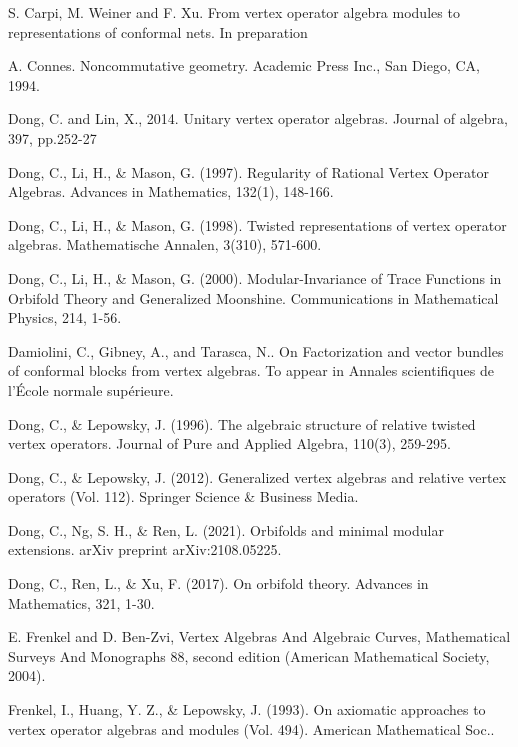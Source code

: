 \documentclass[11pt,b5paper,notitlepage]{article}
\theoremstyle{definition}
\theoremstyle{plain}
\numberwithin{equation}{section}
\begin{document}
\begin{thebibliography}{999999}
S. Carpi, M. Weiner and F. Xu. From vertex operator algebra modules to representations of conformal nets. In preparation


A. Connes. Noncommutative geometry. Academic Press Inc., San Diego, CA, 1994.



Dong, C. and Lin, X., 2014. Unitary vertex operator algebras. Journal of algebra, 397, pp.252-27



Dong, C., Li, H., \& Mason, G. (1997). Regularity of Rational Vertex Operator Algebras. Advances in Mathematics, 132(1), 148-166.

Dong, C., Li, H., \& Mason, G. (1998). Twisted representations of vertex operator algebras. Mathematische Annalen, 3(310), 571-600.

Dong, C., Li, H., \& Mason, G. (2000). Modular-Invariance of Trace Functions in Orbifold Theory and Generalized Moonshine. Communications in Mathematical Physics, 214, 1-56.




Damiolini, C., Gibney, A., and Tarasca, N.. On Factorization and vector bundles of conformal blocks from vertex algebras. To appear in Annales scientifiques de l’École normale supérieure.


Dong, C., \& Lepowsky, J. (1996). The algebraic structure of relative twisted vertex operators. Journal of Pure and Applied Algebra, 110(3), 259-295.

Dong, C., \& Lepowsky, J. (2012). Generalized vertex algebras and relative vertex operators (Vol. 112). Springer Science \& Business Media.


Dong, C., Ng, S. H., \& Ren, L. (2021). Orbifolds and minimal modular extensions. arXiv preprint arXiv:2108.05225.


Dong, C., Ren, L., \& Xu, F. (2017). On orbifold theory. Advances in Mathematics, 321, 1-30.







E. Frenkel and D. Ben-Zvi, Vertex Algebras And Algebraic Curves, Mathematical Surveys And Monographs 88, second edition (American Mathematical Society, 2004).


Frenkel, I., Huang, Y. Z., \& Lepowsky, J. (1993). On axiomatic approaches to vertex operator algebras and modules (Vol. 494). American Mathematical Soc..



\end{thebibliography}
\end{document}
